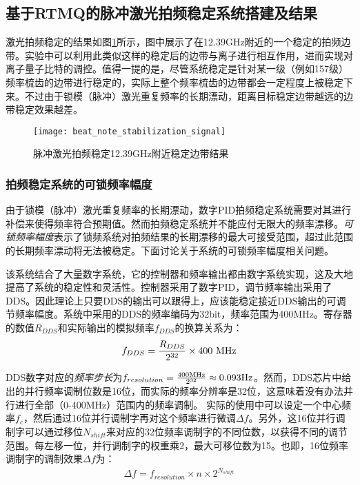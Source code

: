 \subsection[基于RTMQ的脉冲激光拍频稳定系统搭建及结果]{基于RTMQ的脉冲激光拍频稳定系统搭建及结果}

激光拍频稳定的结果如图\ref{fig:beat_note_stabilization_signal}所示，图中展示了在12.39GHz附近的一个稳定的拍频边带。实验中可以利用此类似这样的稳定后的边带与离子进行相互作用，进而实现对离子量子比特的调控。值得一提的是，尽管系统稳定是针对某一级（例如157级）频率梳齿的边带进行稳定的，实际上整个频率梳齿的边带都会一定程度上被稳定下来。不过由于锁模（脉冲）激光重复频率的长期漂动，距离目标稳定边带越远的边带稳定效果越差。
\begin{figure}
    \centering
    \caption[脉冲激光拍频稳定12.39GHz附近稳定边带结果]{脉冲激光拍频稳定12.39GHz附近稳定边带结果\label{fig:beat_note_stabilization_signal}}
    \texttt{[image: beat\_note\_stabilization\_signal]}
\end{figure}

\subsubsection[拍频稳定系统的可锁频率幅度]{拍频稳定系统的可锁频率幅度}
由于锁模（脉冲）激光重复频率的长期漂动，数字PID拍频稳定系统需要对其进行补偿来使得频率符合预期值。然而拍频稳定系统并不能应付无限大的频率漂移。\emph{可锁频率幅度}表示了锁频系统对拍频结果的长期漂移的最大可接受范围，超过此范围的长期频率漂动将无法被稳定。下面讨论关于系统的可锁频率幅度相关问题。

该系统结合了大量数字系统，它的控制器和频率输出都由数字系统实现，这及大地提高了系统的稳定性和灵活性。控制器采用了数字PID，调节频率输出采用了DDS。因此理论上只要DDS的输出可以跟得上，应该能稳定接近DDS输出的可调节频率幅度。系统中采用的DDS的频率编码为32bit，频率范围为400MHz。寄存器的数值$R_{DDS}$和实际输出的模拟频率$f_{DDS}$的换算关系为：
\begin{align}
    f_{DDS}=\frac{R_{DDS}}{2^{32}}\times 400\ \textnormal{MHz}
\end{align}

DDS数字对应的\emph{频率步长}为$f_{resolution}=\frac{400\textnormal{MHz}}{2^{32}}\approx0.093\textnormal{Hz}$。然而，DDS芯片中给出的并行频率调制位数是16位，而实际的频率分辨率是32位，这意味着没有办法并行进行全部（0-400MHz）范围内的频率调制。
实际的使用中可以设定一个中心频率$f_{c}$，然后通过16位并行调制字再对这个频率进行微调$\Delta f$。另外，这16位并行调制字可以通过移位$N_{shift}$来对应的32位频率调制字的不同位数，以获得不同的调节范围。每左移一位，并行调制字的权重乘2，最大可移位数为15。也即，16位频率调制字的调制效果$\Delta f$为：
\begin{align}
    \Delta f=f_{resolution}\times n \times 2^{N_{shift}}
\end{align}

